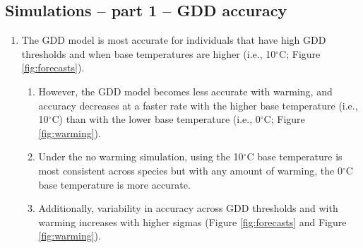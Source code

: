 \documentclass{article}\usepackage[]{graphicx}\usepackage[]{color}
\begin{document}
\begin{enumerate}
  \subsection*{Simulations -- part 1 --  GDD accuracy}
\begin{enumerate}
\item The GDD model is most accurate for individuals that have high GDD thresholds and when base temperatures are higher (i.e., 10$^{\circ}$C; Figure \ref{fig:forecasts}). 
  \begin{enumerate}
  \item However, the GDD model becomes less accurate with warming, and accuracy decreases at a faster rate with the higher base temperature (i.e., 10$^{\circ}$C) than with the lower base temperature (i.e., 0$^{\circ}$C; Figure \ref{fig:warming}).
  \item Under the no warming simulation, using the 10$^{\circ}$C base temperature is most consistent across species but with any amount of warming, the 0$^{\circ}$C base temperature is more accurate. 
  \item Additionally, variability in accuracy across GDD thresholds and with warming increases with higher sigmas (Figure \ref{fig:forecasts} and Figure \ref{fig:warming}).
  \end{enumerate}
\end{enumerate}
\end{enumerate}
\end{document}
